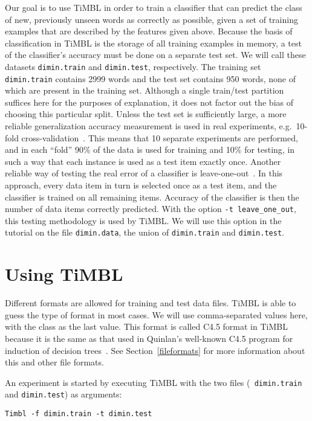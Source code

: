 \documentclass{report}
\begin{document}
Our goal is to use TiMBL in order to train a classifier that can
predict the class of new, previously unseen words as correctly as
possible, given a set of training examples that are described by the
features given above. Because the basis of classification in TiMBL is
the storage of all training examples in memory, a test of the
classifier's accuracy must be done on a separate test set. We will
call these datasets {\tt dimin.train} and {\tt dimin.test},
respectively. The training set {\tt dimin.train} contains 2999 words
and the test set contains 950 words, none of which are present in the
training set. Although a single train/test partition suffices here for
the purposes of explanation, it does not factor out the bias of
choosing this particular split. Unless the test set is sufficiently
large, a more reliable generalization accuracy measurement is used in
real experiments, e.g.~10-fold cross-validation~\cite{Weiss+91}. This
means that 10 separate experiments are performed, and in each ``fold''
90\% of the data is used for training and 10\% for testing, in such a
way that each instance is used as a test item exactly once. Another
reliable way of testing the real error of a classifier is
leave-one-out~\cite{Weiss+91}. In this approach, every data item in
turn is selected once as a test item, and the classifier is trained on
all remaining items. Accuracy of the classifier is then the number of
data items correctly predicted. With the option {\tt -t
leave\_one\_out}, this testing methodology is used by TiMBL. We
will use this option in the tutorial on the file {\tt dimin.data}, the
union of {\tt dimin.train} and {\tt dimin.test}. 

\section{Using TiMBL}

Different formats are allowed for training and test data files. TiMBL
is able to guess the type of format in most cases. We will use
comma-separated values here, with the class as the last value. This
format is called C4.5 format in TiMBL because it is the same as that
used in Quinlan's well-known C4.5 program for induction of decision
trees~\cite{Quinlan93}. See Section~\ref{fileformats} for more
information about this and other file formats.

An experiment is started by executing TiMBL with the two files ({\tt
dimin.train} and {\tt dimin.test}) as arguments:

{\small
\begin{verbatim}
Timbl -f dimin.train -t dimin.test
\end{verbatim}
}
\end{document}

